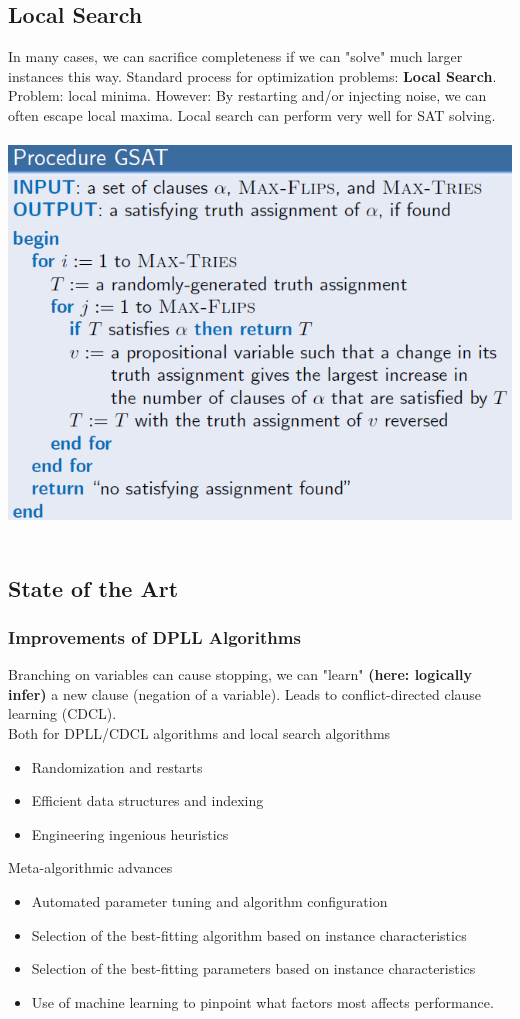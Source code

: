 \documentclass{article}
\begin{document}
\subsection{Local Search}
In many cases, we can sacrifice completeness if we can "solve" much larger instances this way. Standard process for optimization problems: \textbf{Local Search}. Problem: local minima. However: By restarting and/or injecting noise, we can often escape local maxima. Local search can perform very well for SAT solving.\\\\
\includegraphics[scale=0.6]{39.png}\\\\
   
\subsection{State of the Art}
\subsubsection{Improvements of DPLL Algorithms}
Branching on variables can cause stopping, we can "learn" \textbf{(here: logically infer)} a new clause (negation of a variable). Leads to conflict-directed clause learning (CDCL).\\
Both for DPLL/CDCL algorithms and local search algorithms\\
\begin{itemize}
\item Randomization and restarts
\item Efficient data structures and indexing
\item Engineering ingenious heuristics
\end{itemize}
Meta-algorithmic advances\\
\begin{itemize}
\item Automated parameter tuning and algorithm configuration
\item Selection of the best-fitting algorithm based on instance characteristics
\item Selection of the best-fitting parameters based on instance characteristics
\item Use of machine learning to pinpoint what factors most affects performance.
\end{itemize}
\end{document}
